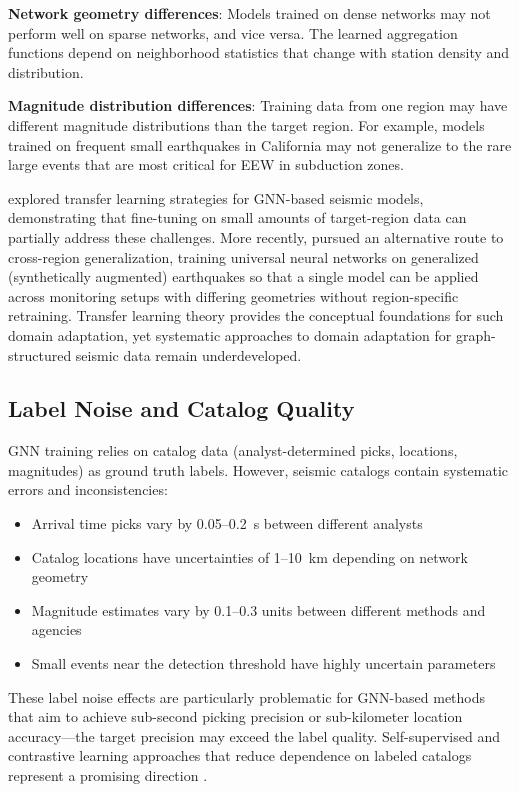 \documentclass[review,authoryear]{elsarticle}
\begin{document}
\textbf{Network geometry differences}: Models trained on dense networks may not perform well on sparse networks, and vice versa. The learned aggregation functions depend on neighborhood statistics that change with station density and distribution.

\textbf{Magnitude distribution differences}: Training data from one region may have different magnitude distributions than the target region. For example, models trained on frequent small earthquakes in California may not generalize to the rare large events that are most critical for EEW in subduction zones.

\citet{jozinovic2022transfer} explored transfer learning strategies for GNN-based seismic models, demonstrating that fine-tuning on small amounts of target-region data can partially address these challenges. More recently, \citet{zhang2024universal} pursued an alternative route to cross-region generalization, training universal neural networks on generalized (synthetically augmented) earthquakes so that a single model can be applied across monitoring setups with differing geometries without region-specific retraining. Transfer learning theory \citep{pan2010survey, weiss2016survey} provides the conceptual foundations for such domain adaptation, yet systematic approaches to domain adaptation for graph-structured seismic data remain underdeveloped.

\subsection{Label Noise and Catalog Quality}

GNN training relies on catalog data (analyst-determined picks, locations, magnitudes) as ground truth labels. However, seismic catalogs contain systematic errors and inconsistencies:

\begin{itemize}
  \item Arrival time picks vary by 0.05--0.2~s between different analysts
  \item Catalog locations have uncertainties of 1--10~km depending on network geometry
  \item Magnitude estimates vary by 0.1--0.3 units between different methods and agencies
  \item Small events near the detection threshold have highly uncertain parameters
\end{itemize}

These label noise effects are particularly problematic for GNN-based methods that aim to achieve sub-second picking precision or sub-kilometer location accuracy---the target precision may exceed the label quality. Self-supervised and contrastive learning approaches that reduce dependence on labeled catalogs represent a promising direction \citep{liu2022graph, chen2020simple}.
\end{document}
